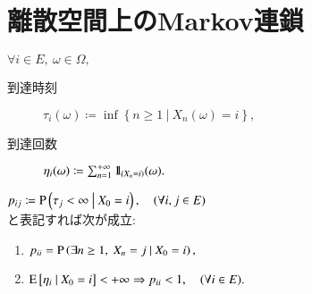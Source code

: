 \section{離散空間上のMarkov連鎖}
	\begin{dfn}[到達時刻と到達回数]
		$\forall i \in E,\ \omega \in \Omega,$
		\begin{description}
			\item[到達時刻] $\tau_i(\omega) \coloneqq \inf{}{\left\{ n \geq 1\ \left|\ X_n(\omega) = i \right.\right\}},$
			\item[到達回数] $\eta_i(\omega) \coloneqq \sum_{n=1}^{+\infty} \mbox{1}\hspace{-0.25em}\mbox{l}_{(X_n = i)}(\omega).$
		\end{description}
	\end{dfn}
	$p_{ij} \coloneqq \operatorname{P} \left( \tau_j < \infty \ \middle|\ X_0 = i \right), \quad (\forall i,j \in E)$\\
	と表記すれば次が成立:
	\begin{enumerate}
		\item $p_{ii} = \operatorname{P} \left( \exists n \geq 1,\ X_n = j \ \middle|\ X_0 = i \right),$
		\item $\operatorname{E} \left[ \eta_i \ \middle|\ X_0 = i \right] < +\infty \Rightarrow p_{ii} < 1, \quad (\forall i \in E).$
	\end{enumerate}
